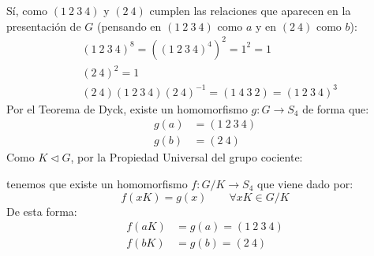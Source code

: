 \documentclass[12pt]{article}
\begin{document}
\begin{ejercicio}[2.5 puntos]
\begin{enumerate}[label=(\alph*)]
                Sí, como $(1\ 2\ 3\ 4)$ y $(2\ 4)$ cumplen las relaciones que aparecen en la presentación de $G$ (pensando en $(1\ 2\ 3\ 4)$ como $a$ y en $(2\ 4)$ como $b$):
                \begin{align*}
                    &{(1\ 2\ 3\ 4)}^{8} = {\left({(1\ 2\ 3\ 4)}^{4}\right)}^{2} = 1^2 = 1 \\
                    &{(2\ 4)}^{2} = 1 \\
                    &(2\ 4)(1\ 2\ 3\ 4){(2\ 4)}^{-1} = (1\ 4\ 3\ 2) = {(1\ 2\ 3\ 4)}^{3}
                \end{align*}
                Por el Teorema de Dyck, existe un homomorfismo $g:G\to S_4$ de forma que:
                \begin{align*}
                    g(a) &= (1\ 2\ 3\ 4) \\
                    g(b) &= (2\ 4)
                \end{align*}
                Como $K\lhd G$, por la Propiedad Universal del grupo cociente: 
                \begin{figure}[H]
                    \centering
                \end{figure}
                tenemos que existe un homomorfismo $f:G/K\to S_4$ que viene dado por:
                \begin{equation*}
                    f(xK) = g(x) \qquad \forall xK\in G/K
                \end{equation*}
                De esta forma:
                \begin{align*}
                    f(aK) &= g(a) = (1\ 2\ 3\ 4) \\
                    f(bK) &= g(b) = (2\ 4)
                \end{align*}
        \end{enumerate}
    \end{ejercicio}
\end{document}
